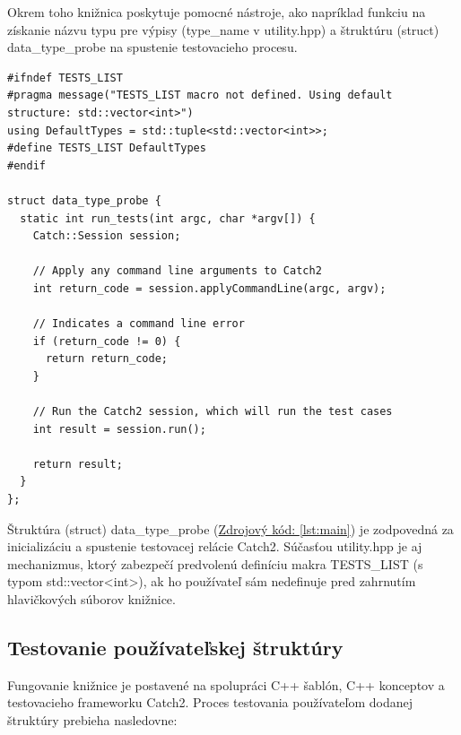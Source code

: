\documentclass[11pt]{article}
\begin{document}
\noindent Okrem toho knižnica poskytuje pomocné nástroje, ako napríklad funkciu na získanie názvu typu pre výpisy (type\_name v utility.hpp) a štruktúru (struct) data\_type\_probe na spustenie testovacieho procesu.
\begin{lstlisting}[caption={Ukážka inicializácie Catch2 relácie}, label={lst:main}]
#ifndef TESTS_LIST
#pragma message("TESTS_LIST macro not defined. Using default structure: std::vector<int>")
using DefaultTypes = std::tuple<std::vector<int>>;
#define TESTS_LIST DefaultTypes
#endif

struct data_type_probe {
  static int run_tests(int argc, char *argv[]) {
    Catch::Session session;

    // Apply any command line arguments to Catch2
    int return_code = session.applyCommandLine(argc, argv);

    // Indicates a command line error
    if (return_code != 0) {
      return return_code;
    }

    // Run the Catch2 session, which will run the test cases
    int result = session.run();

    return result;
  }
};
\end{lstlisting}
\noindent Štruktúra (struct) data\_type\_probe (\hyperref[lst:main]{Zdrojový kód: \ref*{lst:main}}) je zodpovedná za inicializáciu a spustenie testovacej relácie Catch2. Súčasťou utility.hpp je aj mechanizmus, ktorý zabezpečí predvolenú definíciu makra TESTS\_LIST (s typom std::vector<int>), ak ho používateľ sám nedefinuje pred zahrnutím hlavičkových súborov knižnice.

\subsection{Testovanie používateľskej štruktúry}
\label{subsec:princip_fungovania}

Fungovanie knižnice je postavené na spolupráci C++ šablón, C++ konceptov a testovacieho frameworku Catch2. Proces testovania používateľom dodanej štruktúry prebieha nasledovne:
\end{document}
